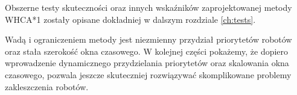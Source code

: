 Obszerne testy skuteczności oraz innych wskaźników zaprojektowanej metody WHCA*1 zostały opisane dokładniej w dalszym rozdziale \ref{ch:tests}.

Wadą i ograniczeniem metody jest niezmienny przydział priorytetów robotów oraz stała szerokość okna czasowego.
W kolejnej części pokażemy, że dopiero wprowadzenie dynamicznego przydzielania priorytetów oraz skalowania okna czasowego, pozwala jeszcze skuteczniej rozwiązywać skomplikowane problemy zakleszczenia robotów.
